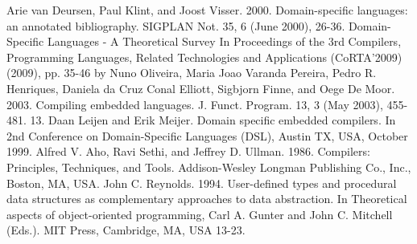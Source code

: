 \documentclass[12pt]{article} %
\begin{document}
\begin{thebibliography}{99}
Arie van Deursen, Paul Klint, and Joost Visser. 2000. Domain-specific languages: an annotated bibliography. SIGPLAN Not. 35, 6 (June 2000), 26-36. 
Domain-Specific Languages - A Theoretical Survey In Proceedings of the 3rd Compilers, Programming Languages, Related Technologies and Applications (CoRTA'2009) (2009), pp. 35-46 by Nuno Oliveira, Maria Joao Varanda Pereira, Pedro R. Henriques, Daniela da Cruz
Conal Elliott, Sigbjorn Finne, and Oege De Moor. 2003. Compiling embedded languages. J. Funct. Program. 13, 3 (May 2003), 455-481.
13.	Daan Leijen and Erik Meijer. Domain specific embedded compilers. In 2nd Conference on Domain-Specific Languages (DSL), Austin TX, USA, October 1999.
Alfred V. Aho, Ravi Sethi, and Jeffrey D. Ullman. 1986. Compilers: Principles, Techniques, and Tools. Addison-Wesley Longman Publishing Co., Inc., Boston, MA, USA.
John C. Reynolds. 1994. User-defined types and procedural data structures as complementary approaches to data abstraction. In Theoretical aspects of object-oriented programming, Carl A. Gunter and John C. Mitchell (Eds.). MIT Press, Cambridge, MA, USA 13-23. 

\end{thebibliography}


\end{document}
